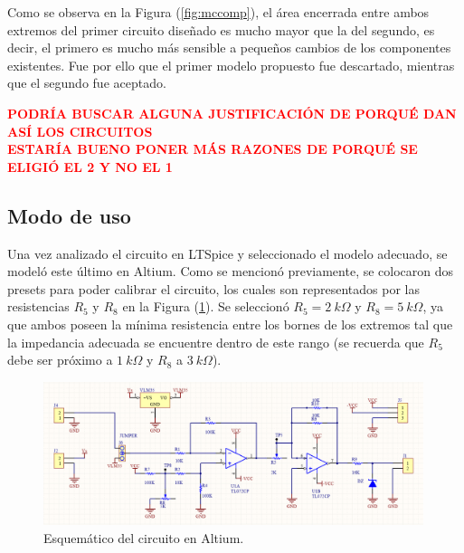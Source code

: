 \documentclass[a4paper]{article}
\begin{document}
Como se observa en la Figura (\ref{fig:mccomp}), el área encerrada entre ambos extremos del primer circuito diseñado es mucho mayor que la del segundo, es decir, el primero es mucho más sensible a pequeños cambios de los componentes existentes. Fue por ello que el primer modelo propuesto fue descartado, mientras que el segundo fue aceptado. 

\begin{center}
	\textcolor{red}{\textbf{PODRÍA BUSCAR ALGUNA JUSTIFICACIÓN DE PORQUÉ DAN ASÍ LOS CIRCUITOS}}\\
	\textcolor{red}{\textbf{ESTARÍA BUENO PONER MÁS RAZONES DE PORQUÉ SE ELIGIÓ EL 2 Y NO EL 1}}
\end{center}

\subsection{Modo de uso}

Una vez analizado el circuito en LTSpice y seleccionado el modelo adecuado, se modeló este último en Altium. Como se mencionó previamente, se colocaron dos presets para poder calibrar el circuito, los cuales son representados por las resistencias $R_5$ y $R_8$ en la Figura (\ref{fig:schematic}). Se seleccionó $R_5 = 2 \ k\Omega$ y $R_8 = 5 \ k\Omega$, ya que ambos poseen la mínima resistencia entre los bornes de los extremos tal que la impedancia adecuada se encuentre dentro de este rango (se recuerda que $R_5$ debe ser próximo a $ 1 \ k\Omega$ y $R_8$ a $ 3 \ k\Omega$).

\begin{figure}[H]
	\centering
	\includegraphics[width=0.99\textwidth]{Ejercicio6/Imagenes/Schematic.png}
	\caption{Esquemático del circuito en Altium.}
	\label{fig:schematic}
\end{figure}
\end{document}
